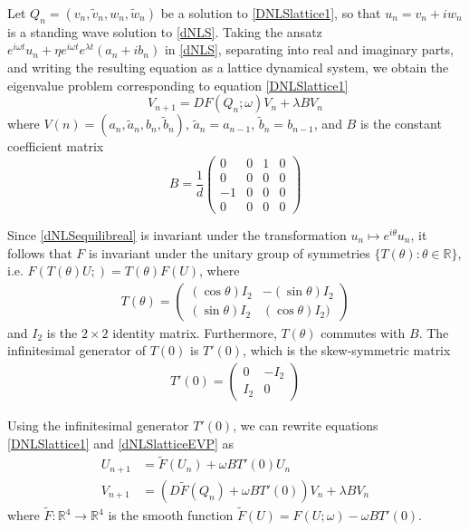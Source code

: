 \documentclass[12pt]{article}
\def\R{{\mathbb R}}
\begin{document}
Let $Q_n = (v_n, \tilde{v}_n, w_n, \tilde{w}_n)$ be a solution to \eqref{DNLSlattice1}, so that $u_n = v_n + i w_n$ is a standing wave solution to \eqref{dNLS}. Taking the ansatz $e^{i\omega t} u_n + \eta e^{i\omega t} e^{\lambda t} (a_n + i b_n)$ in \eqref{dNLS}, separating into real and imaginary parts, and writing the resulting equation as a lattice dynamical system, we obtain the eigenvalue problem corresponding to equation \eqref{DNLSlattice1}
\begin{equation}\label{dNLSlatticeEVP}
V_{n+1} = DF(Q_n; \omega) V_n + \lambda B V_n
\end{equation}
where $V(n) = (a_n, \tilde{a}_n, b_n, \tilde{b}_n)$, $\tilde{a}_n = a_{n-1}$, $\tilde{b}_n = b_{n-1}$, and $B$ is the constant coefficient matrix 
\begin{equation}\label{dNLSB}
B = \frac{1}{d}
\begin{pmatrix}
0 & 0 & 1 & 0 \\
0 & 0 & 0 & 0 \\
-1 & 0 & 0 & 0 \\
0 & 0 & 0 & 0
\end{pmatrix}
\end{equation}

Since \eqref{dNLSequilibreal} is invariant under the transformation $u_n \mapsto e^{i \theta}u_n$, it follows that $F$ is invariant under the unitary group of symmetries $\{T(\theta) : \theta \in \R\}$, i.e. $F(T(\theta)U; ) = T(\theta)F(U)$, where
\begin{align}\label{TdNLS}
T(\theta) =
\begin{pmatrix}
(\cos\theta) I_2 & -(\sin\theta)I_2 \\
(\sin\theta)I_2 & (\cos\theta)I_2)
\end{pmatrix}
\end{align}
and $I_2$ is the $2 \times 2$ identity matrix. Furthermore, $T(\theta)$ commutes with $B$. The infinitesimal generator of $T(0)$ is $T'(0)$, which is the skew-symmetric matrix
\begin{align}\label{dnlsSgen}
T'(0) = \begin{pmatrix}
0 & -I_2 \\
I_2 & 0
\end{pmatrix}
\end{align}

Using the infinitesimal generator $T'(0)$, we can rewrite equations \eqref{DNLSlattice1} and \eqref{dNLSlatticeEVP} as
\begin{align}
U_{n+1} &= \tilde{F}(U_n) + \omega B T'(0) U_n \label{DNLSlattice2} \\
V_{n+1} &= (D\tilde{F}(Q_n) + \omega B T'(0)) V_n + \lambda B V_n \label{dNLSlatticeEVP2} 
\end{align}
where $\tilde{F}:\R^4 \rightarrow \R^4$ is the smooth function $\tilde{F}(U) = F(U; \omega) - \omega B T'(0)$. 
\end{document}
